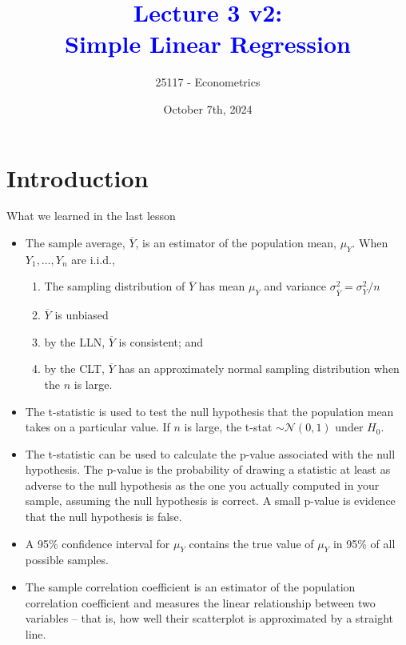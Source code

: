\documentclass[notes,10pt, aspectratio=169]{beamer}
\title[]{\textcolor{blue}{Lecture 3 v2:\\Simple Linear Regression}}
\author{25117 - Econometrics}
\institute[shortinst]{Universitat Pompeu Fabra}
\date{October 7th, 2024}
\begin{document}

\begin{frame}[plain]
\maketitle
\end{frame}

\section{Introduction}

\begin{frame}{What we learned in the last lesson}
\begin{itemize}
    \item The sample average, $\overline{Y}$, is an estimator of the population mean, $\mu_Y$. When $Y_1, \dots ,Y_n$ are i.i.d.,
    \begin{enumerate}
        \item  The sampling distribution of $\overline{Y}$ has mean $\mu_Y$ and variance $\sigma_{\overline{Y}}^2=\sigma_Y^2/n$
        \item $\overline{Y}$ is unbiased
        \item by the LLN, $\overline{Y}$ is consistent; and
        \item by the CLT, $\overline{Y}$ has an approximately normal sampling distribution when the $n$ is large.
    \end{enumerate}
    \item The t-statistic is used to test the null hypothesis that the population mean takes on a particular value. If $n$ is large, the t-stat $\sim \mathcal{N}(0,1)$ under $H_0$.
    \item The t-statistic can be used to calculate the p-value associated with the null hypothesis. The p-value is the probability of drawing a statistic at least as adverse to the null hypothesis as the one you actually computed in your sample, assuming the null hypothesis is correct. A small p-value is evidence that the null hypothesis is false.
    \item A 95\% confidence interval for $\mu_Y$ contains the true value of $\mu_Y$ in 95\% of all possible samples.
    \item The sample correlation coefficient is an estimator of the population correlation coefficient and measures the linear relationship between two variables -- that is, how well their scatterplot is approximated by a straight line.
\end{itemize}
\end{frame}
\end{document}

